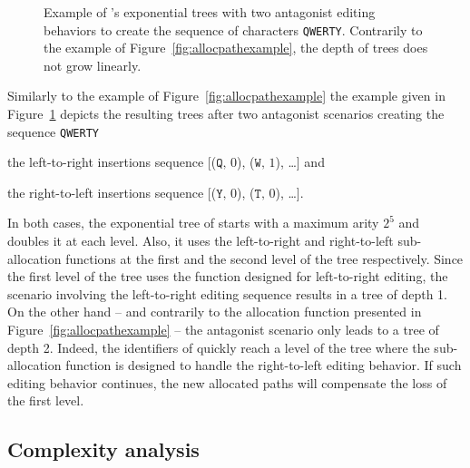 \begin{figure}
  \centering
  \caption{\label{fig:lseqtreeexample} Example of \LSEQ's exponential trees with
    two antagonist editing behaviors to create the sequence of characters
    \texttt{QWERTY}. Contrarily to the example of
    Figure~\ref{fig:allocpathexample}, the depth of trees does not grow
    linearly.}
\end{figure}


Similarly to the example of Figure~\ref{fig:allocpathexample} the example given
in Figure~\ref{fig:lseqtreeexample} depicts the resulting trees after two
antagonist scenarios creating the sequence \texttt{QWERTY}
\begin{inparaenum}[(i)]
\item the left-to-right insertions sequence [($\texttt{Q},\,0$), ($\texttt{W},\,1$),
  \ldots] and
\item the right-to-left insertions sequence [($\texttt{Y},\,0$),
  ($\texttt{T},\,0$), \ldots].
\end{inparaenum}
In both cases, the exponential tree of \LSEQ starts with a maximum arity $2^5$
and doubles it at each level. Also, it uses the left-to-right and right-to-left
sub-allocation functions at the first and the second level of the tree
respectively. Since the first level of the tree uses the function designed for
left-to-right editing, the scenario involving the left-to-right editing sequence
results in a tree of depth 1. On the other hand -- and contrarily to the
allocation function presented in Figure~\ref{fig:allocpathexample} -- the
antagonist scenario only leads to a tree of depth 2. Indeed, the identifiers of
\LSEQ quickly reach a level of the tree where the sub-allocation function is
designed to handle the right-to-left editing behavior. If such editing behavior
continues, the new allocated paths will compensate the loss of the first level.

\subsection{Complexity analysis}
\label{subsec:complexity}

